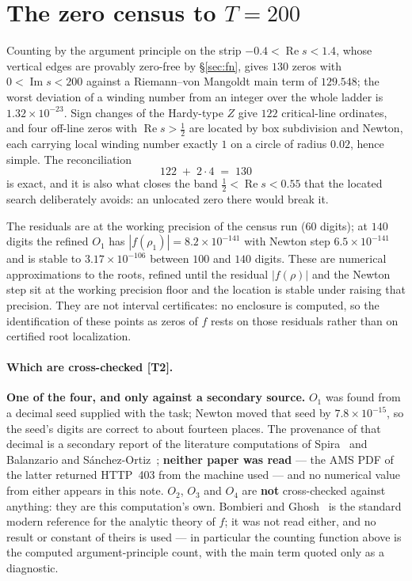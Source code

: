 \documentclass[11pt,a4paper]{article}
\theoremstyle{definition}
\theoremstyle{remark}
\newcommand{\tier}[1]{{\small\textsf{[#1]}}}
\begin{document}
\section{The zero census to $T=200$}\label{sec:census}

Counting by the argument principle on the strip $-0.4<\operatorname{Re}s<1.4$, whose
vertical edges are provably zero-free by \S\ref{sec:fn}, gives $130$ zeros with
$0<\operatorname{Im}s<200$ against a Riemann--von Mangoldt main term of $129.548$; the
worst deviation of a winding number from an integer over the whole ladder is
$1.32\times10^{-23}$. Sign changes of the Hardy-type $Z$ give $122$ critical-line
ordinates, and four off-line zeros with $\operatorname{Re}s>\tfrac12$ are located by box
subdivision and Newton, each carrying local winding number exactly $1$ on a circle of
radius $0.02$, hence simple. The reconciliation
\[
122 \;+\; 2\cdot4 \;=\; 130
\]
is exact, and it is also what closes the band $\tfrac12<\operatorname{Re}s<0.55$ that the
located search deliberately avoids: an unlocated zero there would break it.



\noindent The residuals are at the working precision of the census run ($60$ digits); at
$140$ digits the refined $O_1$ has $|f(\rho_1)| = 8.2\times10^{-141}$ with Newton step
$6.5\times10^{-141}$ and is stable to $3.17\times10^{-106}$ between $100$ and $140$
digits. These are numerical approximations to the roots, refined until the residual
$|f(\rho)|$ and the Newton step sit at the working precision floor and the location is
stable under raising that precision. They are not interval certificates: no enclosure is
computed, so the identification of these points as zeros of $f$ rests on those residuals
rather than on certified root localization.

\paragraph{Which are cross-checked \tier{T2}.} \textbf{One of the four, and only against
a secondary source.} $O_1$ was found from a decimal seed supplied with the task; Newton
moved that seed by $7.8\times10^{-15}$, so the seed's digits are correct to about
fourteen places. The provenance of that decimal is a secondary report of the literature
computations of Spira~\cite{Spira} and Balanzario and
S\'anchez-Ortiz~\cite{BSO}; \textbf{neither paper was read} --- the AMS PDF of the latter
returned HTTP~403 from the machine used --- and no numerical value from either appears
in this note. $O_2$, $O_3$ and $O_4$ are \textbf{not} cross-checked against anything: they
are this computation's own. Bombieri and Ghosh~\cite{BG11} is the standard modern
reference for the analytic theory of $f$; it was not read either, and no result or
constant of theirs is used --- in particular the counting function above is the computed
argument-principle count, with the main term quoted only as a diagnostic.
\end{document}
